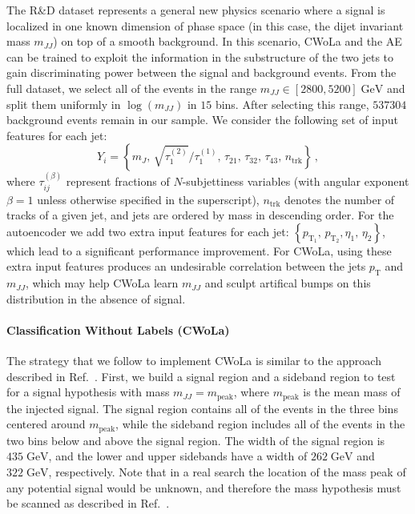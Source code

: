 \documentclass[a4paper,11pt]{article}
\begin{document}
The R\&D dataset represents a general new physics scenario where a signal is localized in one known dimension of phase space (in this case, the dijet invariant mass $m_{JJ}$) on top of a smooth background. In this scenario, CWoLa and the AE can be trained to exploit the information in the substructure of the two jets to gain discriminating power between the signal and background events. From the full dataset, we select all of the events in the range $m_{JJ} \in [2800, 5200] \; \mathrm{GeV}$ and split them uniformly in $\log(m_{JJ})$ in $15$ bins. After selecting this range, $537304$ background events remain in our sample. We consider the following set of input features for each jet:
\begin{equation}
Y_{i} = \left\{ m_{J}, \, \sqrt{\tau_{1}^{(2)}} / \tau_{1}^{(1)}, \, \tau_{21}, \, \tau_{32}, \, \tau_{43}, \, n_{\text{trk}} \right\} \, ,
\label{eq:PMinput}
\end{equation}
where $\tau_{ij}^{(\beta)}$ represent fractions of $N$-subjettiness variables (with angular exponent $\beta = 1$ unless otherwise specified in the superscript), $n_{\text{trk}}$ denotes the number of tracks of a given jet, and jets are ordered by mass in descending order. For the autoencoder we add two extra input features for each jet: $\left\{p_{\text{T}_{1}}, \, p_{\text{T}_{2}}, \eta_{1}, \, \eta_{2}\right\}$, which lead to a significant performance improvement. For CWoLa, using these extra input features produces an undesirable correlation between the jets $p_\text{T}$ and $m_{JJ}$, which may help CWoLa learn $m_{JJ}$ and sculpt artifical bumps on this distribution in the absence of signal.


\paragraph{Classification Without Labels (CWoLa)}
\label{sec:PMCWoLa}

The strategy that we follow to implement CWoLa is similar to the approach described in Ref.~\cite{Collins:2019jip}. First, we build a signal region and a sideband region to test for a signal hypothesis with mass $m_{JJ} = m_{\text{peak}}$, where $m_{\text{peak}}$ is the mean mass of the injected signal. The signal region contains all of the events in the three bins centered around $m_{\text{peak}}$, while the sideband region includes all of the events in the two bins below and above the signal region. The width of the signal region is $435 \; \mathrm{GeV}$, and the lower and upper sidebands have a width of $262 \; \mathrm{GeV}$ and $322 \; \mathrm{GeV}$, respectively. Note that in a real search the location of the mass peak of any potential signal would be unknown, and therefore the mass hypothesis must be scanned as described in Ref.~\cite{Collins:2019jip}.
\end{document}
